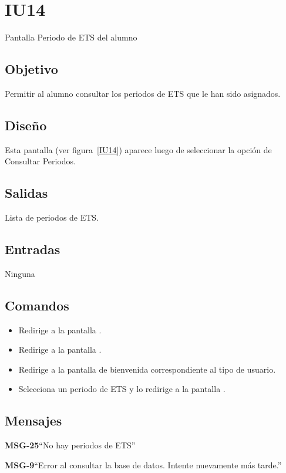 \section{IU14} {Pantalla Periodo de ETS del alumno}

\subsection{Objetivo}
	Permitir al alumno consultar los periodos de ETS que le han sido asignados. 

\subsection{Diseño}
	Esta pantalla  (ver figura~\ref{IU14}) aparece luego de seleccionar la opción de Consultar Periodos.


\subsection{Salidas}
	Lista de periodos de ETS. 

\subsection{Entradas}
Ninguna

\subsection{Comandos}

\begin{itemize}
	\item {} Redirige a la pantalla .
	\item {} Redirige a la pantalla .
	\item {} Redirige a la pantalla de bienvenida correspondiente al tipo de usuario.
	\item {} Selecciona un periodo de ETS y lo redirige a la pantalla .
\end{itemize}

\subsection{Mensajes}

\begin{Citemize}
	\item {\bf MSG-25}{``No hay periodos de ETS''}
	\item {\bf MSG-9}{``Error al consultar la base de datos. Intente nuevamente más tarde.''}
\end{Citemize}

